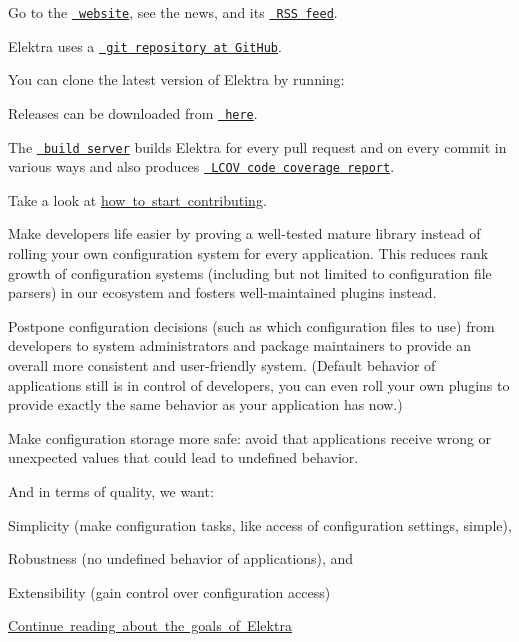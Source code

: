 Go to the \href{https://www.libelektra.org}{\texttt{ website}}, see the news, and its \href{https://www.libelektra.org/news/feed.rss}{\texttt{ R\+SS feed}}.

Elektra uses a \href{https://github.com/ElektraInitiative/libelektra}{\texttt{ git repository at Git\+Hub}}.

You can clone the latest version of Elektra by running\+:


\begin{DoxyCode}{0}
\end{DoxyCode}


Releases can be downloaded from \href{https://www.libelektra.org/ftp/elektra/releases/}{\texttt{ here}}.

The \href{https://build.libelektra.org/}{\texttt{ build server}} builds Elektra for every pull request and on every commit in various ways and also produces \href{https://doc.libelektra.org/coverage/master/debian-buster-full/}{\texttt{ L\+C\+OV code coverage report}}.

Take a look at \mbox{\hyperlink{doc_IDEAS_md}{how to start contributing}}.


\begin{DoxyItemize}
\item Make developer\textquotesingle{}s life easier by proving a well-\/tested mature library instead of rolling your own configuration system for every application. This reduces rank growth of configuration systems (including but not limited to configuration file parsers) in our ecosystem and fosters well-\/maintained plugins instead.
\item Postpone configuration decisions (such as which configuration files to use) from developers to system administrators and package maintainers to provide an overall more consistent and user-\/friendly system. (Default behavior of applications still is in control of developers, you can even roll your own plugins to provide exactly the same behavior as your application has now.)
\item Make configuration storage more safe\+: avoid that applications receive wrong or unexpected values that could lead to undefined behavior.
\end{DoxyItemize}

And in terms of quality, we want\+:


\begin{DoxyEnumerate}
\item Simplicity (make configuration tasks, like access of configuration settings, simple),
\item Robustness (no undefined behavior of applications), and
\item Extensibility (gain control over configuration access)
\end{DoxyEnumerate}

\mbox{\hyperlink{doc_GOALS_md}{Continue reading about the goals of Elektra}} 